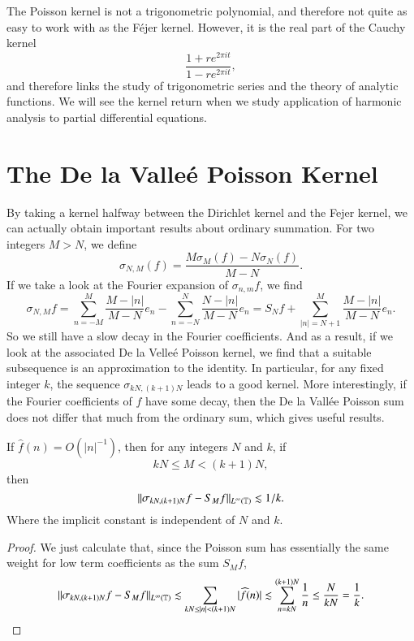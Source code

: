 The Poisson kernel is not a trigonometric polynomial, and therefore not quite as easy to work with as the F\'{e}jer kernel. However, it is the real part of the Cauchy kernel
%
\[ \frac{1 + re^{2 \pi it}}{1 - re^{2 \pi it}}, \]
%
and therefore links the study of trigonometric series and the theory of analytic functions. We will see the kernel return when we study application of harmonic analysis to partial differential equations.

\section{The De la Valle\'{e} Poisson Kernel}

By taking a kernel halfway between the Dirichlet kernel and the Fejer kernel, we can actually obtain important results about ordinary summation. For two integers $M > N$, we define
%
\[ \sigma_{N,M}(f) = \frac{M\sigma_M(f) - N\sigma_N(f)}{M-N}. \]
%
If we take a look at the Fourier expansion of $\sigma_{n,m} f$, we find
%
\[ \sigma_{N,M} f = \sum_{n = -M}^M \frac{M - |n|}{M-N} e_n - \sum_{n = -N}^N \frac{N - |n|}{M-N} e_n = S_N f + \sum_{|n| = N+1}^M \frac{M - |n|}{M - N} e_n. \]
%
So we still have a slow decay in the Fourier coefficients. And as a result, if we look at the associated De la Velle\'{e} Poisson kernel, we find that a suitable subsequence is an approximation to the identity. In particular, for any fixed integer $k$, the sequence $\sigma_{kN,(k+1)N}$ leads to a good kernel. More interestingly, if the Fourier coefficients of $f$ have some decay, then the De la Vall\'{e}e Poisson sum does not differ that much from the ordinary sum, which gives useful results.

\begin{theorem}
    If $\widehat{f}(n) = O(|n|^{-1})$, then for any integers $N$ and $k$, if
    \[ kN \leq M < (k+1)N, \]
    then
    \[ \| \sigma_{kN,(k+1)N} f - S_M f \|_{L^\infty(\operatorname{\mathbb{T}})} \lesssim 1/k. \]
    Where the implicit constant is independent of $N$ and $k$.
\end{theorem}
\begin{proof}
    We just calculate that, since the Poisson sum has essentially the same weight for low term coefficients as the sum $S_M f$,
    \[ \| \sigma_{kN,(k+1)N} f - S_M f \|_{L^\infty(\operatorname{\mathbb{T}})} \lesssim \sum_{kN \leq |n| < (k+1)N} |\widehat{f}(n)| \lesssim \sum_{n = kN}^{(k+1)N} \frac{1}{n} \leq \frac{N}{kN} = \frac{1}{k}. \qedhere \]
\end{proof}

